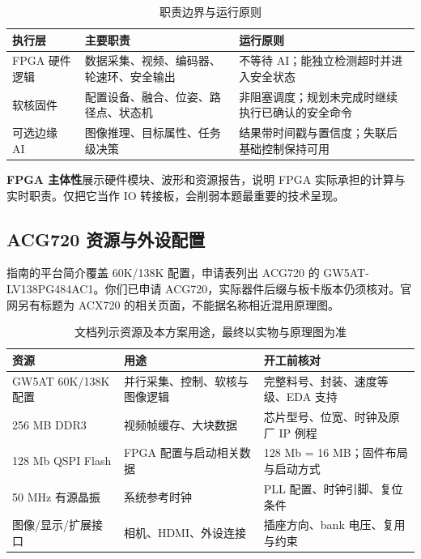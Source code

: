 \documentclass[UTF8,a4paper,zihao=-4,fontset=fandol]{ctexart}
\newcommand{\note}[2]{\par\smallskip\noindent\colorbox{Pale}{\parbox{\dimexpr\linewidth-2\fboxsep\relax}{\small\textbf{\color{Teal}#1}\quad #2}}\par\smallskip}
\newcommand{\nextpage}{\clearpage}
\begin{document}
\begin{table}[H]\small
\caption{职责边界与运行原则}
\begin{tabularx}{\linewidth}{@{}L{2.5cm}Y Y@{}}\toprule
\textbf{执行层} & \textbf{主要职责} & \textbf{运行原则}\\\midrule
FPGA 硬件逻辑 & 数据采集、视频、编码器、轮速环、安全输出 & 不等待 AI；能独立检测超时并进入安全状态\\
软核固件 & 配置设备、融合、位姿、路径点、状态机 & 非阻塞调度；规划未完成时继续执行已确认的安全命令\\
可选边缘 AI & 图像推理、目标属性、任务级决策 & 结果带时间戳与置信度；失联后基础控制保持可用\\\bottomrule
\end{tabularx}
\end{table}
\note{FPGA 主体性}{展示硬件模块、波形和资源报告，说明 FPGA 实际承担的计算与实时职责。仅把它当作 IO 转接板，会削弱本题最重要的技术呈现。}

\nextpage
\subsection{ACG720 资源与外设配置}\label{sub:hardware}

指南的平台简介覆盖 60K/138K 配置，申请表列出 ACG720 的 GW5AT-LV138PG484AC1。你们已申请 ACG720，实际器件后缀与板卡版本仍须核对。官网另有标题为 ACX720 的相关页面，不能据名称相近混用原理图。\cite{contest,board}

\begin{table}[H]\small
\caption{文档列示资源及本方案用途，最终以实物与原理图为准}
\begin{tabularx}{\linewidth}{@{}L{3.5cm}Y Y@{}}\toprule
\textbf{资源} & \textbf{用途} & \textbf{开工前核对}\\\midrule
GW5AT 60K/138K 配置 & 并行采集、控制、软核与图像逻辑 & 完整料号、封装、速度等级、EDA 支持\\
256 MB DDR3 & 视频帧缓存、大块数据 & 芯片型号、位宽、时钟及原厂 IP 例程\\
128 Mb QSPI Flash & FPGA 配置与启动相关数据 & 128 Mb = 16 MB；固件布局与启动方式\\
50 MHz 有源晶振 & 系统参考时钟 & PLL 配置、时钟引脚、复位条件\\
图像/显示/扩展接口 & 相机、HDMI、外设连接 & 插座方向、bank 电压、复用与约束\\\bottomrule
\end{tabularx}
\end{table}
\end{document}
